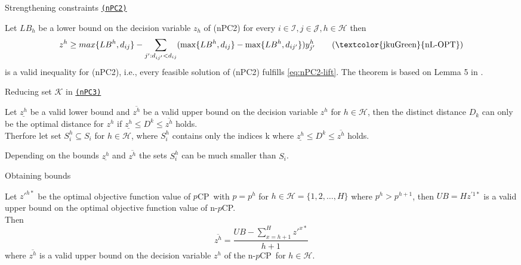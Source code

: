 \documentclass[utf8,aspectratio=169,ngerman,english]{beamer}
\renewcommand{\emph}[1]{\textcolor{jkuGreen}{#1}}
\newcommand{\nPC}{\hyperref[eq:nPC]{\texttt{(nPC1)}}\xspace}
\newcommand{\nPCE}{\hyperref[eq:nPCE]{\texttt{(nPC3)}}\xspace}
\newcommand{\nPCY}{\hyperref[eq:nPCY]{\texttt{(nPC2)}}\xspace}
\newcommand{\pCP}{$p$CP\xspace}
\newcommand{\npCP}{n-$p$CP\xspace}
\begin{document}
\begin{frame}{Strengthening constraints \nPCY} \pause
    \vspace{-2pt}
    \begin{lemma}\label{theorem:strength}
        Let $LB_h$ be a lower bound on the decision variable $z_h$ of (nPC2) for every $i \in \mathcal I, j \in \mathcal J, h \in \mathcal H$ then \pause
        \begin{equation}
            z^h \geq max\{LB^h, d_{ij}\} - \sum_{j':d_{ij'} < d_{ij}} (\max \{\textit{$LB^h$}, d_{ij}\} - \max \{\textit{$LB^h$}, d_{ij'}\})y_{j'}^h  \label{eq:nPC2-lift} \tag{\emph{nL-OPT}}
        \end{equation} \pause
        is a valid inequality for (nPC2), i.e., every feasible solution of (nPC2) fulfills \eqref{eq:nPC2-lift}.
        The theorem is based on Lemma 5 in \textcite{GAAR2022}.
    \end{lemma} 
\end{frame}

\begin{frame}{Reducing set $\mathcal K$ in \nPCE} \pause
    \begin{lemma}\label{lemma:setK}
        Let $\underline{z^h}$ be a valid lower bound and $\overline{z^h}$ be a valid upper bound on the decision variable $z^h$ for $h \in \mathcal H$, then
        the distinct distance $D_k$ can only be the optimal distance for $z^h$ if $\underline{z^h} \leq D^k \leq \overline{z^h}$ holds.  \\ \pause
        Therfore let set $S_i^h \subseteq S_i$ for $h \in \mathcal H$, where $S_i^h$ contains only the indices k where $\underline{z^h} \leq D^k \leq \overline{z^h}$ holds.
    \end{lemma}
    Depending on the bounds $\underline{z^h}$ and $\overline{z^h}$ the sets $S_i^h$ can be much smaller than $S_i$.
\end{frame}

\begin{frame}{Obtaining bounds} \pause
    \begin{lemma}\label{lemma:upperbounds}
        Let $z'^{h*}$ be the optimal objective function value of \pCP\ with $p = p^h$ for $h \in \mathcal H = \{1, 2, \dots, H\}$ where $p^h > p^{h+1}$, \pause
        then $UB = H z^{'1*}$ is a valid upper bound on the optimal objective function value of \npCP. \\ \pause
        Then
        \begin{equation*}
            \overline{z^h} = \frac{UB - \sum_{x = h+1}^{H}z'^{x*}}{h+1}
        \end{equation*} \pause
        where $\overline{z^h}$ is a valid upper bound on the decision variable $z^h$ of the \npCP\ for $h \in \mathcal H$.
    \end{lemma}
\end{frame}
\end{document}
